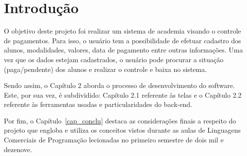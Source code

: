 \chapter{Introdução}\label{cap_intro}

O objetivo deste projeto foi realizar um sistema de academia visando o controle de pagamentos. Para isso, o usuário tem a possibilidade de efetuar cadastro dos alunos, modalidades, valores, data de pagamento entre outras informações. Uma vez que os dados estejam cadastrados, o usuário pode procurar a situação (paga/pendente) dos alunos e realizar o controle e baixa no sistema.

Sendo assim, o Capítulo 2 aborda o processo de desenvolvimento do software. Este, por sua vez, é subdividido: Capítulo 2.1 referente às telas e o Capítulo 2.2 referente às ferramentas usadas e particularidades do back-end.

 Por fim, o Capítulo~\ref{cap_conclu} destaca as considerações finais a respeito do projeto que engloba e utiliza os conceitos vistos durante as aulas de Linguagens Comerciais de Programação lecionadas no primeiro semestre de dois mil e dezenove.
